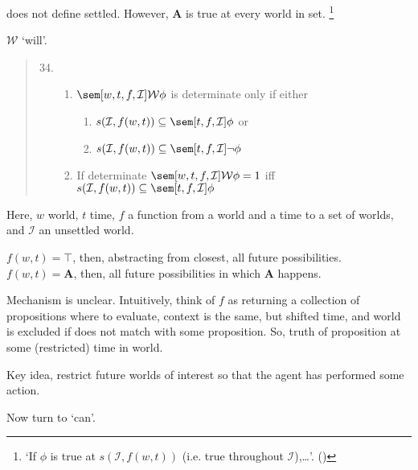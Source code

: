 \begin{note}
  \citeauthor{Boylan:2020aa} does not define settled.
  However, \(\mathbf{A}\) is true at every world in set.%
  \footnote{
    `If \(\phi\) is true at \(s(\mathcal{I}, f(w,t))\) (i.e. true throughout \(\mathcal{I}\)),\dots'. \mbox{(\citeyear[12]{Boylan:2020aa})}
  }

  \(\mathcal{W}\) `will'.

  \begin{quote}
    \begin{enumerate}
      \setcounter{enumi}{33}
    \item
      \begin{enumerate}
      \item
        \(\sem[w,t,f,\mathcal{I}]{\mathcal{W}\phi}\) is determinate only if either
        \begin{enumerate}
        \item
          \(s(\mathcal{I}, f(w,t)) \subseteq \sem[t,f,\mathcal{I}]{\phi}\) or
        \item
          \(s(\mathcal{I}, f(w,t)) \subseteq \sem[t,f,\mathcal{I}]{\lnot\phi}\)
        \end{enumerate}
      \item
        If determinate \(\sem[w,t,f,\mathcal{I}]{\mathcal{W}\phi} = 1\) iff \(s(\mathcal{I}, f(w,t)) \subseteq \sem[t,f,\mathcal{I}]{\phi}\)
      \end{enumerate}
    \end{enumerate}
  \end{quote}

  Here, \(w\) world, \(t\) time, \(f\) a function from a world and a time to a set of worlds, and \(\mathcal{I}\) an unsettled world.

  \(f(w,t) = \top\), then, abstracting from closest, all future possibilities.
  \(f(w,t) = \mathbf{A}\), then, all future possibilities in which \(\mathbf{A}\) happens.

  Mechanism is unclear.
  Intuitively, think of \(f\) as returning a collection of propositions where to evaluate, context is the same, but shifted time, and world is excluded if does not match with some proposition.
  So, truth of proposition at some (restricted) time in world.

  Key idea, restrict future worlds of interest so that the agent has performed some action.

  Now turn to `can'.


\end{note}
